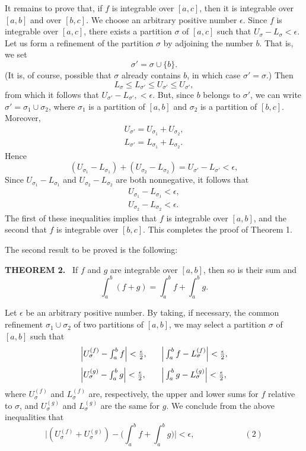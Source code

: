 It remains to prove that, if $f$ is integrable over $[a, c]$, then it is integrable over $[a, b]$ and over $[b, c]$. We choose an arbitrary positive number $\epsilon$. Since $f$ is integrable over $[a, c]$, there exists a partition $\sigma$ of $[a, c]$ such that $U_\sigma - L_\sigma < \epsilon$. Let us form a refinement of the partition $\sigma$ by adjoining the number $b$. That is, we set
$$
\sigma' = \sigma \cup \{ b \}.
$$
(It is, of course, possible that $\sigma$ already contains $b$, in which case $\sigma' = \sigma$.) Then
$$
L_\sigma \leq L_{\sigma'} \leq U_{\sigma'} \leq U_{\sigma'},
$$
from which it follows that $U_{\sigma'}  - L_{\sigma'}, < \epsilon$. But, since $b$ belongs to $\sigma'$, we can write $\sigma' = \sigma_1 \cup \sigma_2$, where $\sigma_1$ is a partition of $[a, b]$ and $\sigma_2$ is a partition of $[b, c]$. Moreover,
\begin{eqnarray*}
U_{\sigma'} = U_{\sigma_1} + U_{\sigma_2},\\
L_{\sigma'} = L_{\sigma_1} + L_{\sigma_2} .
\end{eqnarray*}
Hence 
$$
(U_{\sigma_1} - L_{\sigma_1}) + (U_{\sigma_2} - L_{\sigma_2}) = U_{\sigma'}  - L_{\sigma'} < \epsilon, 
$$
Since $U_{\sigma_1} - L_{\sigma_1}$ and $U_{\sigma_2} - L_{\sigma_2}$
are both nonnegative, it follows that 
\begin{eqnarray*}
U_{\sigma_1} - L_{\sigma_1} < \epsilon,\\
U_{\sigma_2} - L_{\sigma_2} < \epsilon .
\end{eqnarray*}
The first of these inequalities implies that $f$ is integrable over $[a, b]$, and the second that $f$ is integrable over $[b, c]$. This completes the proof of Theorem 1.

The second result to be proved is the following:
\medskip

\noindent \textbf{THEOREM 2.}~
If $f$ and $g$ are integrable over $[a, b]$, then so is their sum and 
$$
\int_a^b (f + g) = \int_a^b f + \int_a^b g .
$$

\medskip

\proof Let $\epsilon$ be an arbitrary positive number. By taking, if necessary, the common refinement $\sigma_1 \cup \sigma_2$ of two partitions of $[a, b]$, we may select a partition $\sigma$ of $[a, b]$ such that
$$
\begin{array}{ll}
\Big| U_\sigma^{(f)} - \int_a^b f \Big| < \frac{\epsilon}{2} , \;\;\;&
\Big| \int_a^b f - L_\sigma^{(f)} \Big| < \frac{\epsilon}{2} , \vspace{.1in}\\
\Big| U_\sigma^{(g)} - \int_a^b g \Big| < \frac{\epsilon}{2},\;\;\;&
\Big| \int_a^b g - L_\sigma^{(g)} \Big| < \frac{\epsilon}{2} ,
\end{array}
$$
where $U_\sigma^{(f)}$ and $L_\sigma^{(f)}$ are, respectively, the upper and lower sums for $f$ relative to $\sigma$, and $U_\sigma^{(g)}$ and $L_\sigma^{(g)}$ are the same for $g$. We conclude from the above inequalities that
$$
\Big| ( U_\sigma^{(f)} + U_\sigma^{(g)} ) - \Big(\int_a^b f + \int_a^b g \Big) \Big| < \epsilon, \hspace{1in}( 2 )
$$

